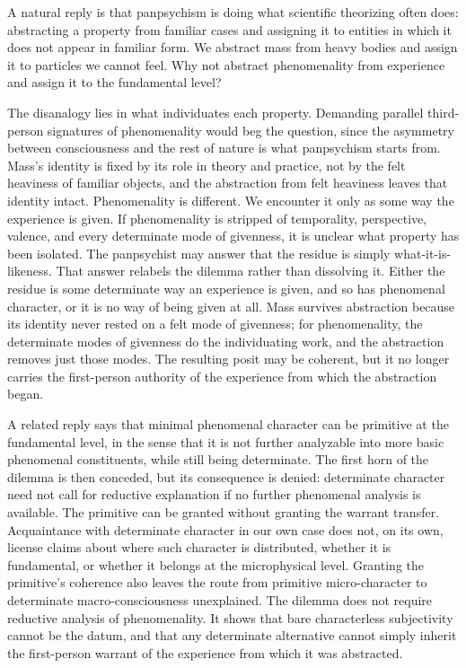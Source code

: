 A natural reply is that panpsychism is doing what scientific theorizing often does: abstracting a property from familiar cases and assigning it to entities in which it does not appear in familiar form. We abstract mass from heavy bodies and assign it to particles we cannot feel. Why not abstract phenomenality from experience and assign it to the fundamental level?

The disanalogy lies in what individuates each property. Demanding parallel third-person signatures of phenomenality would beg the question, since the asymmetry between consciousness and the rest of nature is what panpsychism starts from. Mass's identity is fixed by its role in theory and practice, not by the felt heaviness of familiar objects, and the abstraction from felt heaviness leaves that identity intact. Phenomenality is different. We encounter it only as some way the experience is given. If phenomenality is stripped of temporality, perspective, valence, and every determinate mode of givenness, it is unclear what property has been isolated. The panpsychist may answer that the residue is simply what-it-is-likeness. That answer relabels the dilemma rather than dissolving it. Either the residue is some determinate way an experience is given, and so has phenomenal character, or it is no way of being given at all. Mass survives abstraction because its identity never rested on a felt mode of givenness; for phenomenality, the determinate modes of givenness do the individuating work, and the abstraction removes just those modes. The resulting posit may be coherent, but it no longer carries the first-person authority of the experience from which the abstraction began.

A related reply says that minimal phenomenal character can be primitive at the fundamental level, in the sense that it is not further analyzable into more basic phenomenal constituents, while still being determinate. The first horn of the dilemma is then conceded, but its consequence is denied: determinate character need not call for reductive explanation if no further phenomenal analysis is available. The primitive can be granted without granting the warrant transfer. Acquaintance with determinate character in our own case does not, on its own, license claims about where such character is distributed, whether it is fundamental, or whether it belongs at the microphysical level. Granting the primitive's coherence also leaves the route from primitive micro-character to determinate macro-consciousness unexplained. The dilemma does not require reductive analysis of phenomenality. It shows that bare characterless subjectivity cannot be the datum, and that any determinate alternative cannot simply inherit the first-person warrant of the experience from which it was abstracted.

